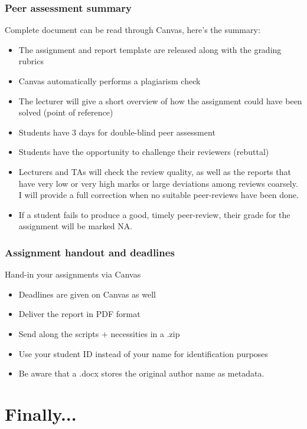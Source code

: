  \begin{frame}
  \frametitle{Peer assessment summary}
  Complete document can be read through Canvas, here's the summary:
  \begin{itemize}
    \item The assignment and report template are released along with the grading rubrics
    \item Canvas automatically performs a plagiarism check
    \item The lecturer will give a short overview of how the assignment could have been solved (point of reference)
    \item Students have 3 days for double-blind peer assessment
    \item Students have the opportunity to challenge their reviewers (rebuttal)
    \item Lecturers and TAs will check the review quality, as well as the reports that have very low or very high marks or large deviations among reviews coarsely. I will provide a full correction when no suitable peer-reviews have been done.
    \item If a student fails to produce a good, timely peer-review, their grade for the assignment will be marked NA.
  \end{itemize}
 \end{frame}
%
\begin{frame}
 \frametitle{Assignment handout and deadlines}
     Hand-in your assignments via Canvas
    \begin{itemize}
      \item Deadlines are given on Canvas as well
      \item Deliver the report in PDF format
      \item Send along the scripts + necessities in a .zip
      \item Use your student ID instead of your name for identification purposes
      \item Be aware that a .docx stores the original author name as metadata.
    \end{itemize}
\end{frame}


\section{Finally...}
